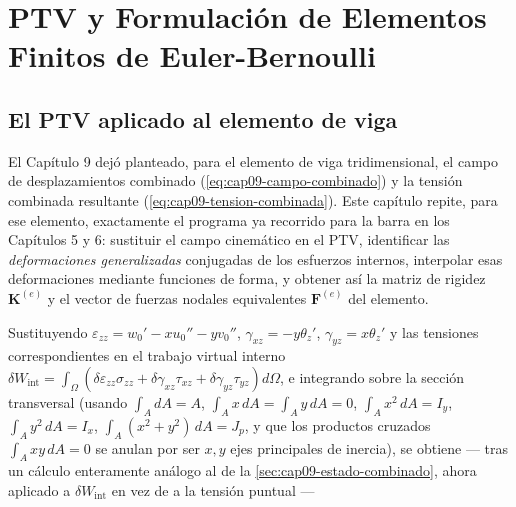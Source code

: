 \chapter{PTV y Formulación de Elementos Finitos de Euler-Bernoulli}
\label{chap:cap10-ptv-formulacion-fem-eb}

\setcounter{MaxMatrixCols}{12}

\section{El PTV aplicado al elemento de viga}
\label{sec:cap10-ptv-viga}

El Capítulo 9 dejó planteado, para el elemento de viga tridimensional, el campo de desplazamientos combinado (\cref{eq:cap09-campo-combinado}) y la tensión combinada resultante (\cref{eq:cap09-tension-combinada}). Este capítulo repite, para ese elemento, exactamente el programa ya recorrido para la barra en los Capítulos 5 y 6: sustituir el campo cinemático en el PTV, identificar las \emph{deformaciones generalizadas} conjugadas de los esfuerzos internos, interpolar esas deformaciones mediante funciones de forma, y obtener así la matriz de rigidez $\bm K^{(e)}$ y el vector de fuerzas nodales equivalentes $\bm F^{(e)}$ del elemento.

Sustituyendo $\varepsilon_{zz}=w_0'-xu_0''-yv_0''$, $\gamma_{xz}=-y\theta_z'$, $\gamma_{yz}=x\theta_z'$ y las tensiones correspondientes en el trabajo virtual interno $\delta W_{\text{int}}=\int_\Omega\left(\delta\varepsilon_{zz}\sigma_{zz}+\delta\gamma_{xz}\tau_{xz}+\delta\gamma_{yz}\tau_{yz}\right)d\Omega$, e integrando sobre la sección transversal (usando $\int_A dA=A$, $\int_A x\,dA=\int_A y\,dA=0$, $\int_A x^2\,dA=I_y$, $\int_A y^2\,dA=I_x$, $\int_A(x^2+y^2)\,dA=J_p$, y que los productos cruzados $\int_A xy\,dA=0$ se anulan por ser $x,y$ ejes principales de inercia), se obtiene --- tras un cálculo enteramente análogo al de la \cref{sec:cap09-estado-combinado}, ahora aplicado a $\delta W_{\text{int}}$ en vez de a la tensión puntual ---

